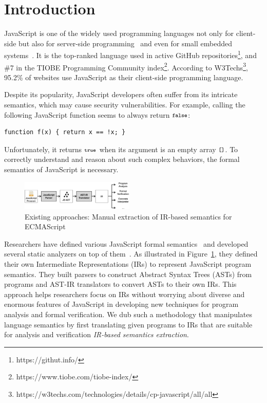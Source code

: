 \section{Introduction}
JavaScript is one of the widely used programming languages not only for client-side
but also for server-side programming~\cite{nodejs, meanjs}
and even for small embedded systems~\cite{espruino, tessel2}.
It is the top-ranked language used in active GitHub
repositories\footnote{https://githut.info/}, and \#7 in the TIOBE
Programming Community index\footnote{https://www.tiobe.com/tiobe-index/}.
According to W3Techs\footnote{https://w3techs.com/technologies/details/cp-javascript/all/all},
95.2\% of websites use JavaScript as their client-side programming language.

Despite its popularity, JavaScript developers often suffer from its intricate semantics,
which may cause security vulnerabilities.  For example, calling the following JavaScript
function seems to always return \( \texttt{\footnotesize false} \):
\begin{lstlisting}[style=myJSstyle]
    function f(x) { return x == !x; }
\end{lstlisting}
Unfortunately, it returns \( \texttt{\footnotesize true} \) when its argument is an empty array
\( \texttt{\footnotesize[]} \).  To correctly understand and reason about such complex
behaviors, the formal semantics of JavaScript is necessary.

\begin{figure}
  \centering
  \includegraphics[width=0.48\textwidth]{img/existing.png}
\vspace*{-2em}
  \caption{Existing approaches: Manual extraction of IR-based semantics for ECMAScript}
  \label{fig:existing}
\vspace*{-1em}
\end{figure}

Researchers have defined various JavaScript formal
semantics~\cite{aplas08,lambdajs,kjs,javert} and developed several static
analyzers on top of them~\cite{jsai,tajs,wala,safe}.  As illustrated
in Figure~\ref{fig:existing}, they defined their own Intermediate
Representations (IRs) to represent JavaScript program semantics.  They
built parsers to construct Abstract Syntax Trees (ASTs) from
programs and AST-IR translators to convert ASTs
to their own IRs.  This approach helps researchers focus on IRs
without worrying about diverse and enormous features of JavaScript in
developing new techniques for program analysis and formal verification.
We dub such a methodology that manipulates language semantics by first
translating given programs to IRs that are suitable for analysis and
verification \textit{IR-based semantics extraction}.

